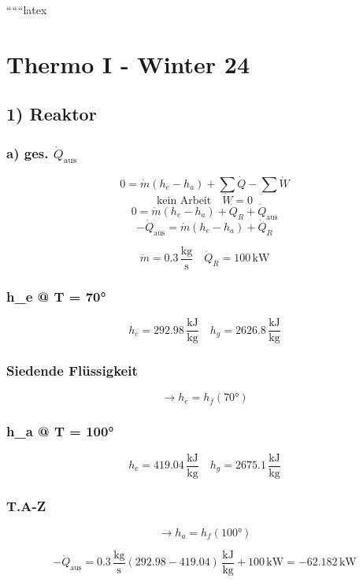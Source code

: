 
``````latex


\section*{Thermo I - Winter 24}

\subsection*{1) Reaktor}

\subsubsection*{a) ges. $\dot{Q}_{\text{aus}}$}

\[
0 = \dot{m} (h_e - h_a) + \sum \dot{Q} - \sum \dot{W}
\]
\[
\text{kein Arbeit} \quad \dot{W} = 0
\]
\[
0 = \dot{m} (h_e - h_a) + \dot{Q}_{R} + \dot{Q}_{\text{aus}}
\]
\[
-\dot{Q}_{\text{aus}} = \dot{m} (h_e - h_a) + \dot{Q}_{R}
\]

\[
\dot{m} = 0.3 \, \frac{\text{kg}}{\text{s}} \quad \dot{Q}_{R} = 100 \, \text{kW}
\]

\subsubsection*{h_e @ T = 70°}

\[
h_c = 292.98 \, \frac{\text{kJ}}{\text{kg}} \quad h_g = 2626.8 \, \frac{\text{kJ}}{\text{kg}}
\]

\subsubsection*{Siedende Flüssigkeit}

\[
\rightarrow h_e = h_f (70°)
\]

\subsubsection*{h_a @ T = 100°}

\[
h_c = 419.04 \, \frac{\text{kJ}}{\text{kg}} \quad h_g = 2675.1 \, \frac{\text{kJ}}{\text{kg}}
\]

\subsubsection*{T.A-Z}

\[
\rightarrow h_a = h_f (100°)
\]

\[
-\dot{Q}_{\text{aus}} = 0.3 \, \frac{\text{kg}}{\text{s}} \left( 292.98 - 419.04 \right) \, \frac{\text{kJ}}{\text{kg}} + 100 \, \text{kW} = -62.182 \, \text{kW}
\]

